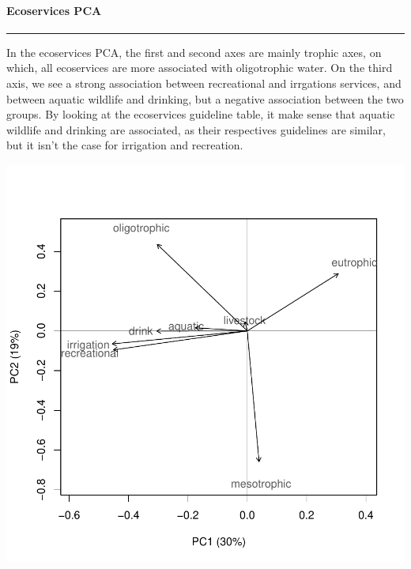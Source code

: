 \documentclass[]{article}
\let\oldparagraph\paragraph
\renewcommand{\paragraph}[1]{\oldparagraph{#1}\mbox{}}
\begin{document}
\paragraph{Ecoservices PCA}\label{ecoservices-pca}

\begin{center}\rule{0.5\linewidth}{\linethickness}\end{center}

In the ecoservices PCA, the first and second axes are mainly trophic
axes, on which, all ecoservices are more associated with oligotrophic
water. On the third axis, we see a strong association between
recreational and irrgations services, and between aquatic wildlife and
drinking, but a negative association between the two groups. By looking
at the ecoservices guideline table, it make sense that aquatic wildlife
and drinking are associated, as their respectives guidelines are
similar, but it isn't the case for irrigation and recreation.

\begin{center}\includegraphics{figures/services PCA-1} \end{center}
\end{document}
